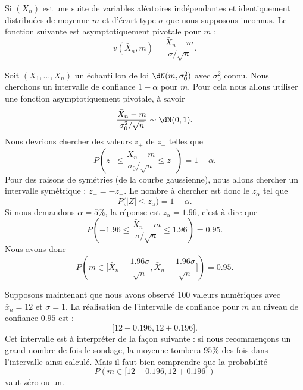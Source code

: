 \begin{example}
    Si \( (X_n)\) est une suite de variables aléatoires indépendantes et identiquement distribuées de moyenne \( m\) et d'écart type \( \sigma\) que nous supposons inconnus. Le fonction suivante est asymptotiquement pivotale pour \( m\) :
    \begin{equation}
        v(\bar X_n,m)=\frac{ \bar X_n-m }{ \sigma/\sqrt{n} }.
    \end{equation}
\end{example}

Soit \( (X_1,\ldots,X_n)\) un échantillon de loi \( \dN(m,\sigma_0^2)\) avec \( \sigma_0^2\) connu. Nous cherchons un intervalle de confiance \( 1-\alpha\) pour \( m\). Pour cela nous allons utiliser une fonction asymptotiquement pivotale, à savoir
\begin{equation}
    \frac{ \bar X_n-m }{ \sigma_0^2/\sqrt{n} }\sim\dN(0,1).
\end{equation}
Nous devrions chercher des valeurs \( z_+\) de \( z_-\) telles que
\begin{equation}
    P\left( z_-\leq \frac{ \bar X_n-m }{ \sigma_0/\sqrt{n} }\leq z_+ \right)=1-\alpha.
\end{equation}
Pour des raisons de symétries (de la courbe gaussienne), nous allons chercher un intervalle symétrique : \( z_-=-z_+\). Le nombre à chercher est donc le \( z_{\alpha}\) tel que
\begin{equation}
    P\big( | Z |\leq z_{\alpha} \big)=1-\alpha.
\end{equation}
Si nous demandons \( \alpha=5\%\), la réponse est \( z_{\alpha}=1.96\), c'est-à-dire que
\begin{equation}
    P\left( -1.96\leq \frac{ \bar X_n-m }{ \sigma/\sqrt{n} }\leq 1.96 \right)=0.95.
\end{equation}
Nous avons donc
\begin{equation}
    P\left( m\in\big[ \bar X_n-\frac{ 1.96\sigma }{ \sqrt{n} },\bar X_n+\frac{ 1.96\sigma }{ \sqrt{n} } \big] \right)=0.95.
\end{equation}

Supposons maintenant que nous avons observé \( 100\) valeurs numériques avec \( \bar x_n=12\) et \( \sigma=1\). La réalisation de l'intervalle de confiance pour \( m\) au niveau de confiance \( 0.95\) est :
\begin{equation}
    \big[ 12-0.196,12+0.196 \big].
\end{equation}
Cet intervalle est à interpréter de la façon suivante : si nous recommençons un grand nombre de fois le sondage, la moyenne tombera \( 95\%\) des fois dans l'intervalle ainsi calculé. Mais il faut bien comprendre que la probabilité
\begin{equation}
    P\left( m\in\big[ 12-0.196,12+0.196 \big] \right)
\end{equation}
vaut zéro ou un.


